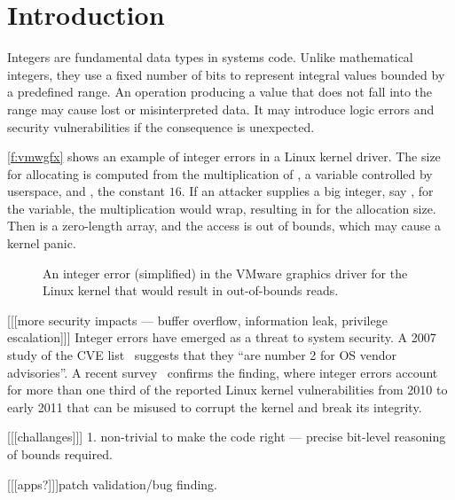 \section{Introduction}
\label{s:intro}

Integers are fundamental data types in systems code.  Unlike
mathematical integers, they use a fixed number of bits to represent
integral values bounded by a predefined range.  An operation producing
a value that does not fall into the range may cause lost or
misinterpreted data.  It may introduce logic errors and security
vulnerabilities if the consequence is unexpected.

\autoref{f:vmwgfx} shows an example of integer errors in a Linux
kernel driver.  The size for allocating  is computed
from the multiplication of , a variable
controlled by userspace, and ,
the constant $16$.  If an attacker supplies a big integer, say
, for the variable, the multiplication would
wrap, resulting in  for the allocation
size.  Then  is a zero-length array, and the access
 is out of bounds, which may cause a kernel
panic.

\begin{figure}[h]

\caption{An integer error (simplified) in the VMware graphics driver
for the Linux kernel that would result in out-of-bounds reads.}
\label{f:vmwgfx}
\end{figure}

[[[more security impacts --- buffer overflow, information leak,
privilege escalation]]]
Integer errors have emerged as a threat to system security.  A 2007
study of the CVE list~\cite{christey:vuln} suggests that they ``are
number 2 for OS vendor advisories''.  A recent survey~\cite{chen:kbugs}
confirms the finding, where integer errors account for more than
one third of the reported Linux kernel vulnerabilities from 2010
to early 2011 that can be misused to corrupt the kernel and break
its integrity.

[[[challanges]]]
1. non-trivial to make the code right
--- precise bit-level reasoning of bounds required.

[[[apps?]]]patch validation/bug finding.
